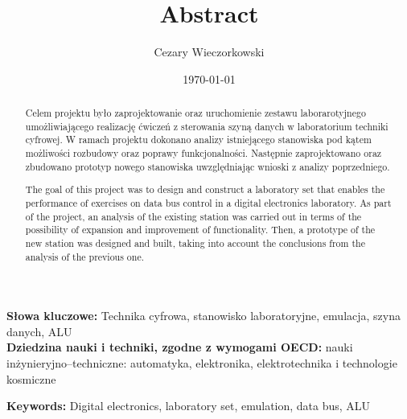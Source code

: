 \documentclass[../main.tex]{subfiles}
\author{Cezary Wieczorkowski}
\date{\today}
\title{Abstract}
\begin{document}
\begin{abstract}
Celem projektu było zaprojektowanie oraz uruchomienie zestawu laborarotyjnego umożliwiającego
realizację ćwiczeń z sterowania szyną danych w laboratorium techniki cyfrowej. W ramach projektu dokonano analizy
istniejącego stanowiska pod kątem możliwości rozbudowy oraz poprawy funkcjonalności. Następnie zaprojektowano oraz 
zbudowano prototyp nowego stanowiska uwzględniając wnioski z analizy poprzedniego.
\end{abstract}
\textbf{Słowa kluczowe:} Technika cyfrowa, stanowisko laboratoryjne, emulacja, szyna danych, ALU \\
\textbf{Dziedzina nauki i techniki, zgodne z wymogami OECD:} nauki inżynieryjno--techniczne: automatyka, elektronika, 
elektrotechnika i technologie kosmiczne
\newpage
{}
\begin{abstract}
The goal of this project was to design and construct a laboratory set that enables the performance of 
exercises on data bus control in a digital electronics laboratory. As part of the project, an analysis of the existing 
station was carried out in terms of the possibility of expansion and improvement of functionality. Then, a prototype of 
the new station was designed and built, taking into account the conclusions from the analysis of the previous one.
\end{abstract}
\textbf{Keywords:} Digital electronics, laboratory set, emulation, data bus, ALU \\
\end{document}
